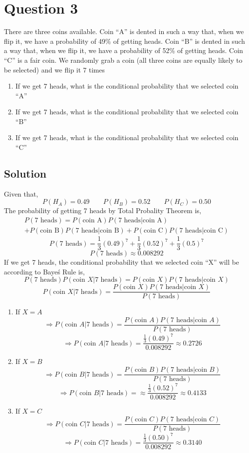 \documentclass[a4paper, 11pt]{article}
\begin{document}
\section*{Question 3}
There are three coins available.  Coin ``A'' is dented in such a way that, when we flip it, we have a probability of 49\% of getting heads.  Coin ``B'' is dented in such a way that, when we flip it, we have a probability of 52\% of getting heads.  Coin ``C'' is a fair coin. We randomly grab a coin (all three coins are equally likely to be selected) and we flip it 7 times
\begin{enumerate}[label=(\alph*)]
    \item If we get 7 heads, what is the conditional probability that we selected coin ``A''
    \item If we get 7 heads, what is the conditional probability that we selected coin ``B''
    \item If we get 7 heads, what is the conditional probability that we selected coin ``C''
\end{enumerate}
\subsection*{Solution}
Given that,
\begin{equation*}
    P(H_A)=0.49 \qquad P(H_B)=0.52 \qquad P(H_C)=0.50
\end{equation*}
The probability of getting 7 heads by Total Probality Theorem is,
\begin{multline*}
    P(7\text{ heads})=P(\text{coin A})P(7\text{ heads}|\text{coin A})
    \\+P(\text{coin B})P(7\text{ heads}|\text{coin B})+P(\text{coin C})P(7\text{ heads}|\text{coin C})
\end{multline*}
\[P(7\text{ heads})=\frac{1}{3}(0.49)^7+\frac{1}{3}(0.52)^7+\frac{1}{3}(0.5)^7\]
\[P(7\text{ heads})\approx 0.008292\]
If we get 7 heads, the conditional probability that we selected coin ``X'' will be according to Baye\'s Rule is,
\[P(7\text{ heads})P(\text{coin }X|7\text{ heads})=P(\text{coin }X)P(7\text{ heads}|\text{coin }X)\]
\[P(\text{coin }X|7\text{ heads})=\frac{P(\text{coin }X)P(7\text{ heads}|\text{coin }X)}{P(7\text{ heads})}\]
\begin{enumerate}[label=(\alph*)]
    \item If $X=A$
          \[\Rightarrow P(\text{coin }A|7\text{ heads})=\frac{P(\text{coin }A)P(7\text{ heads}|\text{coin }A)}{P(7\text{ heads})}\]
          \[\Rightarrow P(\text{coin }A|7\text{ heads})=\frac{\frac{1}{3}(0.49)^7}{0.008292}\approx0.2726\]
    \item If $X=B$
          \[\Rightarrow P(\text{coin }B|7\text{ heads})=\frac{P(\text{coin }B)P(7\text{ heads}|\text{coin }B)}{P(7\text{ heads})}\]
          \[\Rightarrow P(\text{coin }B|7\text{ heads})=\approx \frac{\frac{1}{3}(0.52)^7}{0.008292}\approx 0.4133\]
    \item If $X=C$
          \[\Rightarrow P(\text{coin }C|7\text{ heads})=\frac{P(\text{coin }C)P(7\text{ heads}|\text{coin }C)}{P(7\text{ heads})}\]
          \[\Rightarrow P(\text{coin }C|7\text{ heads})=\frac{\frac{1}{3}(0.50)^7}{0.008292}\approx 0.3140\]
\end{enumerate}
\end{document}
